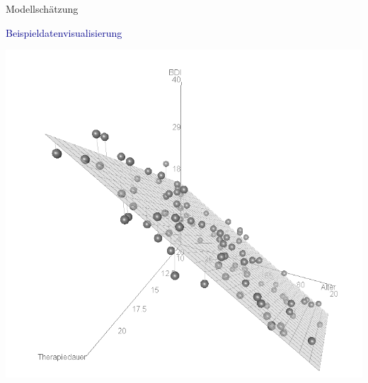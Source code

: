 \documentclass[
  8pt,
  ignorenonframetext,
]{beamer}
\begin{document}
\begin{frame}{Modellschätzung}
\protect\hypertarget{modellschuxe4tzung-14}{}
\vspace{2mm}

\textcolor{darkblue}{Beispieldatenvisualisierung} \vspace{1mm}

\center

\begin{center}\includegraphics[width=0.6\linewidth]{12_Abbildungen/alm_2_beispieldatensatz_fit} \end{center}
\end{frame}
\end{document}
